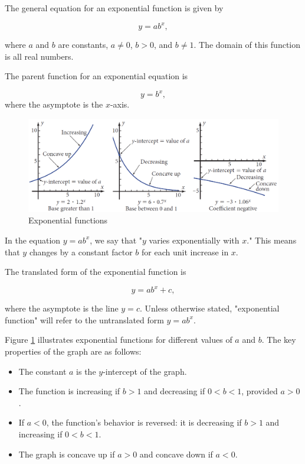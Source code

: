 The general equation for an exponential function is given by

\[
y = a b^x,
\]

where \(a\) and \(b\) are constants, \(a \neq 0\), \(b > 0\), and \(b \neq 1\). The domain of this function is all real numbers.

The parent function for an exponential equation is

\[
y = b^x,
\]
where the asymptote is the \(x\)-axis.

\begin{figure}[h]
    \centering
    \includegraphics[width=1\textwidth]{figure/book4.png} %
    \caption{Exponential functions}
    \label{fig:book_image4}
\end{figure}

In the equation \(y = a b^x\), we say that "\(y\) varies exponentially with \(x\)." This means that \(y\) changes by a constant factor \(b\) for each unit increase in \(x\).

The translated form of the exponential function is

\[
y = a b^x + c,
\]

where the asymptote is the line \(y = c\). Unless otherwise stated, "exponential function" will refer to the untranslated form \(y = a b^x\).

Figure \ref{fig:book_image4} illustrates exponential functions for different values of \(a\) and \(b\). The key properties of the graph are as follows:
\begin{itemize}
    \item The constant \(a\) is the \(y\)-intercept of the graph.
    \item The function is increasing if \(b > 1\) and decreasing if \(0 < b < 1\), provided \(a > 0\).
    \item If \(a < 0\), the function's behavior is reversed: it is decreasing if \(b > 1\) and increasing if \(0 < b < 1\).
    \item The graph is concave up if \(a > 0\) and concave down if \(a < 0\).
\end{itemize}

